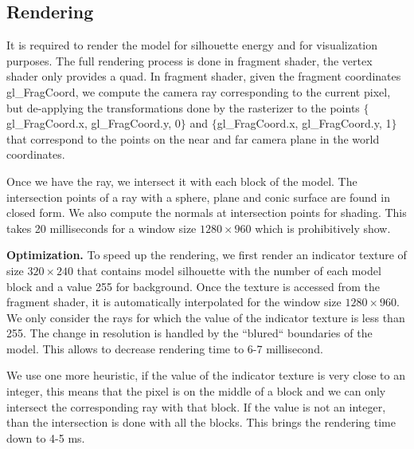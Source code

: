 \subsection{Rendering}
It is required to render the model for silhouette energy and for visualization purposes. The full rendering process is done in fragment shader, the vertex shader only provides a quad. 
In fragment shader, given the fragment coordinates gl\_FragCoord, we compute the camera ray corresponding to the current pixel, but de-applying the transformations done by the rasterizer to the points $\{$gl\_FragCoord.x, gl\_FragCoord.y, 0$\}$ and $\{$gl\_FragCoord.x, gl\_FragCoord.y, 1$\}$ that correspond to the points on the near and far camera plane in the world coordinates.

Once we have the ray, we intersect it with each block of the model. The intersection points of a ray with a sphere, plane and conic surface are found in closed form. We also compute the normals at intersection points for shading. This takes 20 milliseconds for a window size $1280 \times 960$ which is prohibitively show.

\textbf{Optimization.} To speed up the rendering, we first render an indicator texture of size $320 \times 240$ that contains model silhouette with the number of each model block and a value 255 for background. Once the texture is accessed from the fragment shader, it is automatically interpolated for the window size  $1280 \times 960$. We only consider the rays for which the value of the indicator texture is less than 255. The change in resolution is handled by the ``blured`` boundaries of the model. This allows to decrease rendering time to 6-7 millisecond. 

We use one more heuristic, if the value of the indicator texture is very close to an integer, this means that the pixel is on the middle of a block and we can only intersect the corresponding ray with that block. If the  value is not an integer, than the intersection is done with all the blocks. This brings the rendering time down to 4-5 ms. 